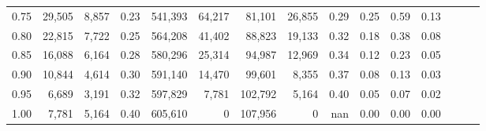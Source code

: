 \begin{tabular}{rrrrrrrrrrrrrrr}
0.75 &  29,505 &  8,857 &  0.23 &  541,393 &   64,217 &   81,101 &   26,855 &  0.29 &  0.25 &  0.59 &      0.13 \\
0.80 &  22,815 &  7,722 &  0.25 &  564,208 &   41,402 &   88,823 &   19,133 &  0.32 &  0.18 &  0.38 &      0.08 \\
0.85 &  16,088 &  6,164 &  0.28 &  580,296 &   25,314 &   94,987 &   12,969 &  0.34 &  0.12 &  0.23 &      0.05 \\
0.90 &  10,844 &  4,614 &  0.30 &  591,140 &   14,470 &   99,601 &    8,355 &  0.37 &  0.08 &  0.13 &      0.03 \\
0.95 &   6,689 &  3,191 &  0.32 &  597,829 &    7,781 &  102,792 &    5,164 &  0.40 &  0.05 &  0.07 &      0.02 \\
1.00 &   7,781 &  5,164 &  0.40 &  605,610 &        0 &  107,956 &        0 &   nan &  0.00 &  0.00 &      0.00 \\
\bottomrule
\end{tabular}
